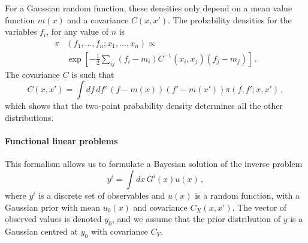For a Gaussian random function, these densities only depend on a mean value
function $m(x)$ and a covariance $C(x,x')$. The probability densities for the
variables $f_i$, for any value of $n$ is 
\begin{align}
  \label{eq:GaussianFunctC}
  \pi&\left(f_1, \ldots, f_n; x_1, \ldots, x_n\right) 
  \propto \nonumber \\ 
  &\exp \left[ 
      -\frac12 \sum_{ij} \left(f_i - m_i\right) C^{-1}(x_i,x_j) \left(f_j - m_j\right)
    \right]\, .
\end{align} 
The covariance $C$ is such that
\begin{equation}
  \label{eq:CovFunctInt}
  C(x,x') = \int df\, df'\, \left(f - m(x)\right) \left(f'-m(x')\right)
    \pi\left(f,f';x,x'\right)\,,
\end{equation}
which shows that the two-point probability density determines all the other
distributions. 

\paragraph{Functional linear problems} This formalism allows us to formulate a
Bayesian solution of the inverse problem 
\begin{equation}
  \label{eq:BayesLinearInverse}
  y^i = \int dx\, G^i(x) u(x)\, ,
\end{equation}
where $y^i$ is a discrete set of observables and $u(x)$ is a random function,
with a Gaussian prior with mean $u_0(x)$ and covariance $C_{X}(x,x')$. The
vector of observed values is denoted $y_0$, and we assume that the prior
distribution of $y$ is a Gaussian centred at $y_0$ with covariance $C_{Y}$.

